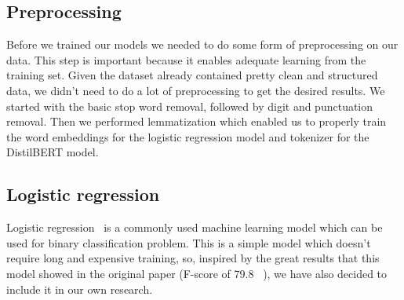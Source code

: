 \documentclass[10pt, a4paper]{article}
\begin{document}
\subsection{Preprocessing}
Before we trained our models we needed to do some form of preprocessing on our data.
This step is important because it enables adequate learning from the training set.
Given the dataset already contained pretty clean and structured data, we didn't need to do a lot of preprocessing to get the desired results.
We started with the basic stop word removal, followed by digit and punctuation removal.
Then we performed lemmatization which enabled us to properly train the word embeddings for the logistic regression model and tokenizer for the DistilBERT model.

\subsection{Logistic regression}
Logistic regression~\citep{logreg} is a commonly used machine learning model which can be used for binary classification problem.
This is a simple model which doesn't require long and expensive training, so, inspired by the great results that this model showed in the original paper (F-score of 79.8 ~\citep{turcan-mckeown-2019-dreaddit}), we have also decided to
include it in our own research.
\end{document}

